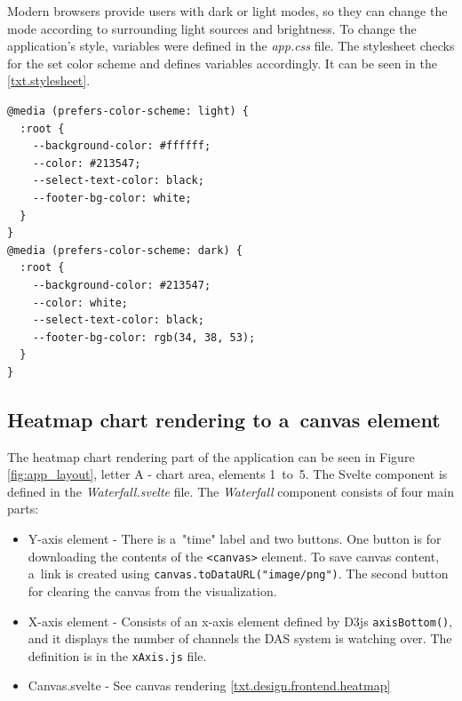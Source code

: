 Modern browsers provide users with dark or light modes, so they can change the mode according to surrounding light sources and brightness. To change the application's style, variables were defined in the \textit{app.css} file. The stylesheet checks for the set color scheme and defines variables accordingly. It can be seen in the \ref{txt.stylesheet}.

\label{txt.stylesheet}
\begin{lstlisting}[style=htmlcssjs]
@media (prefers-color-scheme: light) {
  :root {
    --background-color: #ffffff;
    --color: #213547;
    --select-text-color: black;
    --footer-bg-color: white;
  }
}
@media (prefers-color-scheme: dark) {
  :root {
    --background-color: #213547;
    --color: white;
    --select-text-color: black;
    --footer-bg-color: rgb(34, 38, 53);
  }
}
\end{lstlisting}

\newpage
\subsection{Heatmap chart rendering to a~canvas element}

The heatmap chart rendering part of the application can be seen in Figure \ref{fig:app_layout}, letter A - chart area, elements 1~to~5. The Svelte component is defined in the \textit{Waterfall.svelte} file. The \textit{Waterfall} component consists of four main parts:

\begin{itemize}
    \item Y-axis element - There is a~"time" label and two buttons. One button is for downloading the contents of the \verb|<canvas>| element. To save canvas content, a~link is created using \verb|canvas.toDataURL("image/png")|. The second button for clearing the canvas from the visualization. 
    \item X-axis element - Consists of an x-axis element defined by D3js \verb|axisBottom()|, and it displays the number of channels the DAS system is watching over. The definition is in the \texttt{xAxis.js} file.
    \item Canvas.svelte - See canvas rendering \ref{txt.design.frontend.heatmap}
\end{itemize}

